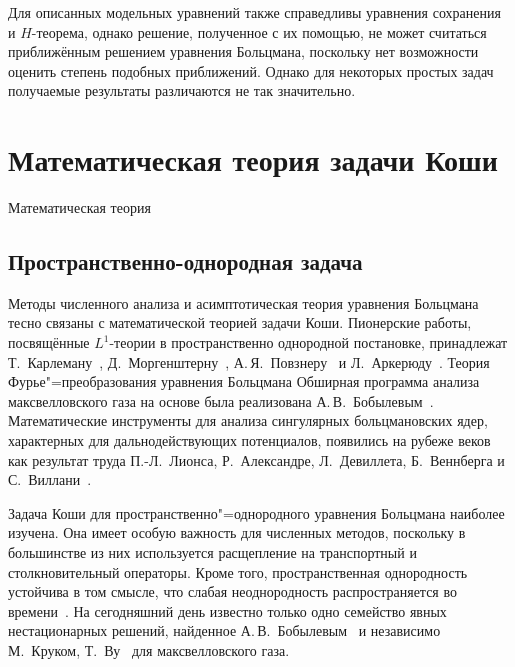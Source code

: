 Для описанных модельных уравнений также справедливы уравнения сохранения и \(H\)-теорема,
однако решение, полученное с их помощью, не может считаться приближённым решением
уравнения Больцмана, поскольку нет возможности оценить степень подобных приближений.
Однако для некоторых простых задач получаемые результаты различаются не так значительно.

\section{Математическая теория задачи Коши} \label{sect:cauchy}

Математическая теория

\subsection{Пространственно-однородная задача}

Методы численного анализа и асимптотическая теория уравнения Больцмана тесно связаны
с математической теорией задачи Коши.
Пионерские работы, посвящённые \(L^1\)-теории в пространственно однородной постановке,
принадлежат Т.~Карлеману~\autocite{Carleman1933}, Д.~Моргенштерну~\autocite{Morgenstern1954},
А.\,Я.~Повзнеру~\autocite{Povzner1962} и Л.~Аркерюду~\autocite{Arkeryd1972}.
Теория Фурье"=преобразования уравнения Больцмана Обширная программа анализа максвелловского газа на основе
была реализована А.\,В.~Бобылевым~\autocite{Bobylev1984}.
Математические инструменты для анализа сингулярных больцмановских ядер,
характерных для дальнодействующих потенциалов, появились на рубеже веков как результат труда
П.-Л.~Лионса, Р.~Александре, Л.~Девиллета, Б.~Веннберга и С.~Виллани~\autocite{Lions1989, Alexandre2000}.


Задача Коши для пространственно"=однородного уравнения Больцмана наиболее изучена.
Она имеет особую важность для численных методов, поскольку в большинстве из них используется
расщепление на транспортный и столкновительный операторы.
Кроме того, пространственная однородность устойчива в том смысле, что
слабая неоднородность распространяется во времени~\cite{Arkeryd1987}.
На сегодняшний день известно только одно семейство явных нестационарных решений,
найденное А.\,В.~Бобылевым~\cite{Bobylev1975} и независимо М.~Круком, Т.~Ву~\cite{Krook1976} для максвелловского газа.

